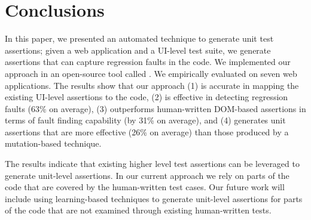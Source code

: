 \section{Conclusions} \label{Sec:concs}
In this paper, we presented an automated technique to generate \javascript unit test assertions; given  a web application and a UI-level test suite, we generate assertions that can capture regression faults in the \javascript code. We implemented our approach in an open-source tool called \tool. We empirically evaluated \tool on seven web applications. The results show that our approach (1) is accurate in mapping the existing UI-level assertions to the \javascript code, (2) is effective in detecting regression faults (63\% on average), (3) outperforms human-written DOM-based assertions in terms of fault finding capability (by 31\% on average), and (4) generates unit assertions that are more effective (26\% on average) than those produced by a mutation-based technique.

The results indicate that existing higher level test assertions can be leveraged to generate unit-level assertions. In our current approach we rely on parts of the code that are covered by the human-written test cases. Our future work will include using learning-based techniques to generate unit-level assertions for parts of the code that are not examined through existing human-written tests.     
